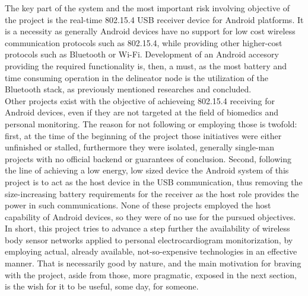 		The key part of the system and the most important risk involving objective of the project is the real-time 802.15.4 USB receiver device for Android platforms. It is a necessity as generally Android devices have no support for low cost wireless communication protocols such as 802.15.4, while providing other higher-cost protocols such as Bluetooth or Wi-Fi. Development of an Android accesory providing the required functionality is, then, a must, as the most battery and time consuming operation in the delineator node is the utilization of the Bluetooth stack, as previously mentioned researches \cite{ESL} and \cite{ecg.del.paper} concluded.\\

		Other projects exist with the objective of achieveing 802.15.4 receiving for Android devices, even if they are not targeted at the field of biomedics and personal monitoring. The reason for not following or employing those is twofold: 
		first, at the time of the beginning of the project those initiatives were either unfinished or stalled, furthermore they were isolated, generally single-man projects with no official backend or guarantees of conclusion.
		Second, following the line of achieving a low energy, low sized device the Android system of this project is to act as the host device in the USB communication, thus removing the size-increasing battery requirements for the receiver as the host role provides the power in such communications. None of these projects employed the host capability of Android devices, so they were of no use for the pursued objectives.\\

		In short, this project tries to advance a step further the availability of wireless body sensor networks applied to personal electrocardiogram monitorization, by employing actual, already available, not-so-expensive technologies in an effective manner. That is necessarily good by nature, and the main motivation for braving with the project, aside from those, more pragmatic, exposed in the next section, is the wish for it to be useful, some day, for someone.

